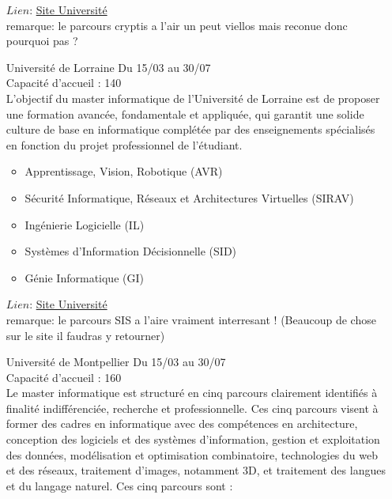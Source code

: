 \documentclass[a4paper,11pt]{article}
\begin{document}
\begin{enumerate}
\begin{itemize}
                \end{itemize}
                $Lien$: \href{http://www.cryptis.fr/index.php}{Site Université}
                \\ remarque: le parcours cryptis a l'air un peut viellos mais reconue donc pourquoi pas ?
\\
        \item [\color{LightOrangeHaf}Université de Lorraine] Du 15/03 au 30/07
                \\Capacité d'accueil : 140
                \\L’objectif du master informatique de l’Université de Lorraine est de proposer une formation avancée, fondamentale et appliquée, qui garantit une solide culture de base en informatique complétée par des enseignements spécialisés en fonction du projet professionnel de l’étudiant.
                \begin{itemize}
                    \item Apprentissage, Vision, Robotique (AVR)
                    \item Sécurité Informatique, Réseaux et Architectures Virtuelles (SIRAV) 
                    \item Ingénierie Logicielle (IL) 
                    \item Systèmes d’Information Décisionnelle (SID)
                    \item Génie Informatique (GI)
                \end{itemize}
                $Lien$: \href{http://licence-master-informatique.formation.univ-lorraine.fr/master/}{Site Université}
                \\ remarque: le parcours SIS a l'aire vraiment interresant ! (Beaucoup de chose sur le site il faudras y retourner)
\\
        \item [\color{LightOrangeHaf}Université de Montpellier] Du 15/03 au 30/07
                \\Capacité d'accueil : 160
                \\Le master informatique est structuré en cinq parcours clairement identifiés à finalité indifférenciée, recherche et professionnelle. Ces cinq parcours visent à former des cadres en informatique avec des compétences en architecture, conception des logiciels et des systèmes d’information, gestion et exploitation des données, modélisation et optimisation combinatoire, technologies du web et des réseaux, traitement d’images, notamment 3D, et traitement des langues et du langage naturel. Ces cinq parcours sont : 

\end{enumerate}
\end{document}
